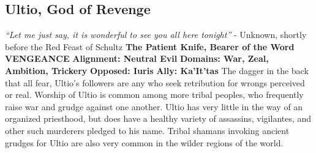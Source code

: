 \subsection{Ultio, God of Revenge}\label{god:ultio}
\textit{“Let me just say, it is wonderful to see you all here tonight”}
\break
\hspace*{\fill}- Unknown, shortly before the Red Feast of Schultz
\break
\break
\textbf{The Patient Knife, Bearer of the Word VENGEANCE}\break
\hspace*{\fill}\break
\textbf{Alignment:\hspace*{\fill} Neutral Evil} \break
\textbf{Domains:\hspace*{\fill} War, Zeal, Ambition, Trickery} \break
\textbf{Opposed:\hspace*{\fill} Iuris} \break
\textbf{Ally:\hspace*{\fill} Ka’It’tas} \break
\hspace*{\fill}\break
The dagger in the back that all fear, Ultio’s followers are any who seek retribution for wrongs perceived or real. Worship of Ultio is common among more tribal peoples, who frequently raise war and grudge against one another.\newline
Ultio has very little in the way of an organized priesthood, but does have a healthy variety of assassins, vigilantes, and other such murderers pledged to his name.  Tribal shamans invoking ancient grudges for Ultio are also very common in the wilder regions of the world. 

